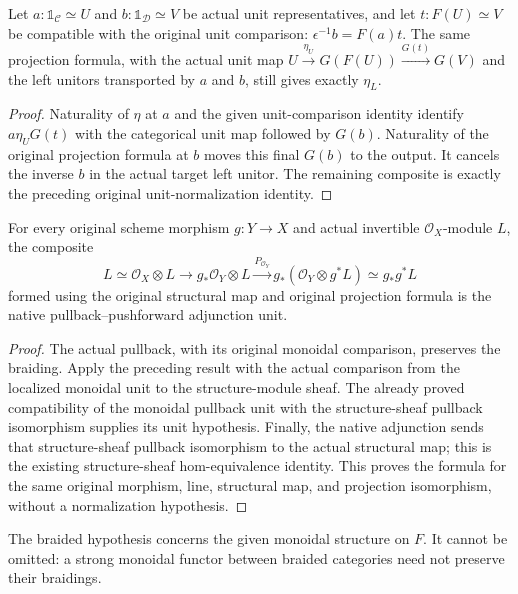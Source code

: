 \begin{lemma}
\label{lem:line-pf-actual-unit-representatives}
\leanok
Let $a:\mathbb1_{\mathcal C}\simeq U$ and
$b:\mathbb1_{\mathcal D}\simeq V$ be actual unit representatives,
and let $t:F(U)\simeq V$ be compatible with the original unit comparison:
$\epsilon^{-1}b=F(a)t$.
The same projection formula, with the actual unit map
$U\xrightarrow{\eta_U}G(F(U))\xrightarrow{G(t)}G(V)$ and the left
unitors transported by $a$ and $b$, still gives exactly $\eta_L$.
\end{lemma}
\begin{proof}
Naturality of $\eta$ at $a$ and the given unit-comparison identity
identify $a\eta_U G(t)$ with the categorical unit map followed by
$G(b)$.  Naturality of the original projection formula at $b$
moves this final $G(b)$ to the output.  It cancels the inverse $b$
in the actual target left unitor.  The remaining composite is exactly
the preceding original unit-normalization identity.
\end{proof}

\begin{lemma}
\label{lem:line-pf-native-adjunction-unit}
\leanok
For every original scheme morphism $g:Y\to X$ and actual invertible
$\mathcal O_X$-module $L$, the composite
\[
 L\simeq\mathcal O_X\otimes L
 \longrightarrow g_*\mathcal O_Y\otimes L
 \xrightarrow{P_{\mathcal O_Y}}g_*(\mathcal O_Y\otimes g^*L)
 \simeq g_*g^*L
\]
formed using the original structural map and original projection
formula is the native pullback--pushforward adjunction unit.
\end{lemma}
\begin{proof}
The actual pullback, with its original monoidal comparison, preserves
the braiding.  Apply the preceding result with the actual comparison
from the localized monoidal unit to the structure-module sheaf.
The already proved compatibility of the monoidal pullback unit with
the structure-sheaf pullback isomorphism supplies its unit hypothesis.
Finally, the native adjunction sends that structure-sheaf pullback
isomorphism to the actual structural map; this is the existing
structure-sheaf hom-equivalence identity.  This proves the formula
for the same original morphism, line, structural map, and projection
isomorphism, without a normalization hypothesis.
\end{proof}

The braided hypothesis concerns the given monoidal structure on $F$.
It cannot be omitted: a strong monoidal functor between braided
categories need not preserve their braidings.
